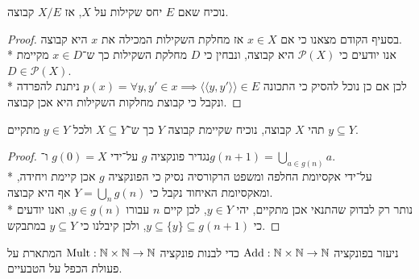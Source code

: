 \Subquestion{}
נוכיח שאם $E$ יחס שקילות על $X$, אז $X / E$ קבוצה.
\begin{proof}
	בסעיף הקודם מצאנו כי אם $x \in X$ אז מחלקת השקילות המכילה את $x$ היא קבוצה. \\*
	אנו יודעים כי $\mathcal{P}(X)$ היא קבוצה, ונבחין כי $D$ מחלקת השקילות כך ש־$x \in D$ מקיימת $D \in \mathcal{P}(X)$. \\*
	לכן אם כן נוכל להסיק כי התכונה $p(x) = \forall y, y' \in x \implies \langle \langle y, y' \rangle \rangle \in E$ ניתנת להפרדה ונקבל כי קבוצת מחלקות השקילות היא אכן קבוצה.
\end{proof}

\Question{}
תהי $X$ קבוצה, נוכיח שקיימת קבוצה $Y$ כך ש־$X \subseteq Y$ ולכל $y \in Y$ מתקיים $y \subseteq Y$.
\begin{proof}
	נגדיר פונקציה $g$ על־ידי $g(0) = X$ ו־$g(n + 1) = \bigcup_{a \in g(n)} a$. \\*
	על־ידי אקסיומת החלפה ומשפט הרקורסיה נסיק כי הפונקציה $g$ אכן קיימת ויחידה, ומאקסיומת האיחוד נקבל כי $Y = \bigcup_n g(n)$ אף היא קבוצה. \\*
	נותר רק לבדוק שהתנאי אכן מתקיים, יהי $y \in Y$, לכן קיים $n$ עבורו $y \in g(n)$, ואנו יודעים כי $y \subseteq \{ y \} \subseteq g(n + 1)$, ולכן קיבלנו כי $y \subseteq Y$ במתבקש.
\end{proof}

\Question{}
\Subquestion{}
ניעזר בפונקציה $\operatorname{Add} : \mathbb{N} \times \mathbb{N} \to \mathbb{N}$ כדי לבנות פונקציה $\operatorname{Mult} : \mathbb{N} \times \mathbb{N} \to \mathbb{N}$ המתארת על פעולת הכפל על הטבעיים.


